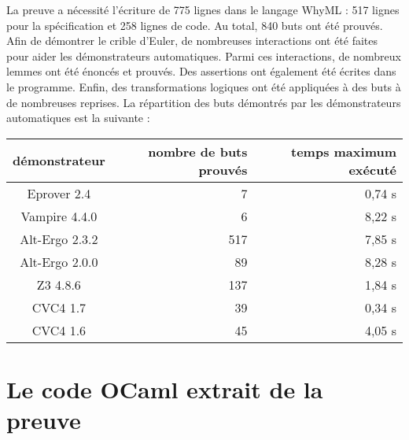 \documentclass[a4paper]{easychair}
\begin{document}
La preuve a nécessité l'écriture de 775 lignes dans le langage WhyML :
517 lignes pour la spécification et 258 lignes de code.
Au total, 840 buts ont été prouvés.
Afin de démontrer le crible d'Euler, de nombreuses interactions ont été
faites pour aider les démonstrateurs automatiques.
Parmi ces interactions, de nombreux lemmes ont été énoncés et prouvés.
Des assertions ont également été écrites dans le programme.
Enfin, des transformations logiques ont  été appliquées à des buts à
de nombreuses reprises.
La répartition des buts démontrés par les démonstrateurs automatiques est la
suivante :
\begin{center}
  \begin{tabular}{|c|r|r|}
    \hline
    démonstrateur & nombre de buts prouvés & temps maximum exécuté \\
    \hline\hline
    Eprover 2.4    &     7 &      0,74 s \\\hline
    Vampire 4.4.0  &     6 &      8,22 s \\\hline
    Alt-Ergo 2.3.2 &   517 &      7,85 s \\\hline
    Alt-Ergo 2.0.0 &    89 &      8,28 s \\\hline
    Z3 4.8.6       &   137 &      1,84 s \\\hline
    CVC4 1.7       &    39 &      0,34 s \\\hline
    CVC4 1.6       &    45 &      4,05 s \\\hline
  \end{tabular}
\end{center}


\section{Le code OCaml extrait de la preuve}
\label{sec:extraction}
\end{document}

